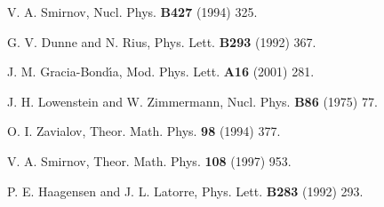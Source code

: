 \documentclass[a4paper,12pt]{article}
\providecommand{\7}{\dagger}           %
\theoremstyle{plain}
\theoremstyle{definition}
\begin{document}
\begin{thebibliography}{53}
V. A. Smirnov,
Nucl. Phys. {\bf B427} (1994) 325.

 G. V. Dunne and N. Rius,
Phys. Lett. {\bf B293} (1992) 367.

J. M. Gracia-Bond\'{\i}a,
Mod. Phys. Lett. {\bf A16} (2001) 281.

J. H. Lowenstein and W. Zimmermann,
Nucl. Phys. {\bf B86} (1975) 77.

O. I. Zavialov,
Theor. Math. Phys. {\bf 98} (1994) 377.

V. A. Smirnov,
Theor. Math. Phys. {\bf 108} (1997) 953.

P. E. Haagensen and J. L. Latorre,
Phys. Lett. {\bf B283} (1992) 293.

\end{thebibliography}
\end{document}
